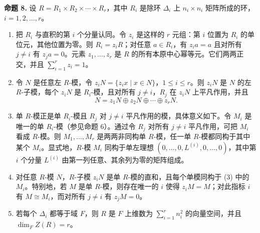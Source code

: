 \medskip
\noindent\textbf{命题 8.} 设 $R=R_1\times R_2\times\cdots\times R_r$，其中 $R_i$ 是除环 $\Delta_i$ 上 $n_i\times n_i$ 矩阵所成的环，$i=1,2,
\ldots,r$。
\begin{enumerate}[label=(\arabic*)]
  \item 把 $R_i$ 与直积的第 $i$ 个分量认同。令 $z_i$ 是这样的 $r$ 元组：第 $i$ 位置为 $R_i$ 的单位元，其他位置为零。则 $R_i=z_iR$；对任意 $a\in R_i$，有 $z_i a=a$ 且对所有 $j\neq i$ 有 $z_j a=0$。元素 $z_1,
  \ldots,z_r$ 是 $R$ 的所有本原中心幂等元。它们两两正交，并且 $\sum_{i=1}^r z_i=1$。
  \item 令 $N$ 是任意左 $R$-模，令 $z_iN=\{z_ix\mid x\in N\}$，$1\leq i\leq r$。则 $z_iN$ 是 $N$ 的左 $R$-子模，每个 $z_iN$ 是 $R_i$-模，且对所有 $j\neq i$，$R_j$ 在 $z_iN$ 上平凡作用，并且
  \[
    N=z_1N\oplus z_2N\oplus\cdots\oplus z_rN.
  \]
  \item 单 $R$-模正是单 $R_i$-模且 $R_j$ 对 $j\neq i$ 平凡作用的模，具体意义如下。令 $M_i$ 是唯一的单 $R_i$-模（参见命题 6）。通过令 $R_j$ 对所有 $j\neq i$ 平凡作用，可把 $M_i$ 看成 $R$-模。则 $M_1,
  \ldots,M_r$ 是两两非同构单 $R$-模，任一单 $R$-模都同构于其中某个 $M_i$。显式地，$R$-模 $M_i$ 同构于单左理想 $(0,
  \ldots,0,L^{(i)},0,
  \ldots,0)$，其中第 $i$ 个分量 $L^{(i)}$ 由第一列任意、其余列为零的矩阵组成。
  \item 对任意 $R$-模 $N$，$R$-子模 $z_iN$ 是单 $R$-模的直和，且每个单模同构于 (3) 中的 $M_i$。特别地，若 $M$ 是单 $R$-模，则存在唯一的 $i$ 使得 $z_iM=M$；对此指标 $i$ 有 $M\cong M_i$，而对所有 $j\neq i$ 有 $z_jM=0$。
  \item 若每个 $\Delta_i$ 都等于域 $F$，则 $R$ 是 $F$ 上维数为 $\sum_{i=1}^r n_i^2$ 的向量空间，并且 $\dim_F Z(R)=r$。
\end{enumerate}

